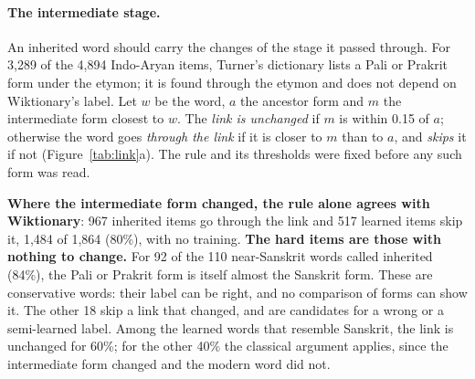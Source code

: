 \documentclass[11pt]{article}
\begin{document}
\paragraph{The intermediate stage.} An inherited word should carry the changes of the stage it passed through. For 3,289 of the 4,894 Indo-Aryan items, Turner's dictionary lists a Pali or Prakrit form under the etymon; it is found through the etymon and does not depend on Wiktionary's label. Let $w$ be the word, $a$ the ancestor form and $m$ the intermediate form closest to $w$. The \textit{link is unchanged} if $m$ is within 0.15 of $a$; otherwise the word goes \textit{through the link} if it is closer to $m$ than to $a$, and \textit{skips} it if not (Figure~\ref{tab:link}a). The rule and its thresholds were fixed before any such form was read.

\textbf{Where the intermediate form changed, the rule alone agrees with Wiktionary}: 967 inherited items go through the link and 517 learned items skip it, 1,484 of 1,864 (80\%), with no training. \textbf{The hard items are those with nothing to change.} For 92 of the 110 near-Sanskrit words called inherited (84\%), the Pali or Prakrit form is itself almost the Sanskrit form. These are conservative words: their label can be right, and no comparison of forms can show it. The other 18 skip a link that changed, and are candidates for a wrong or a semi-learned label. Among the learned words that resemble Sanskrit, the link is unchanged for 60\%; for the other 40\% the classical argument applies, since the intermediate form changed and the modern word did not.
\end{document}
